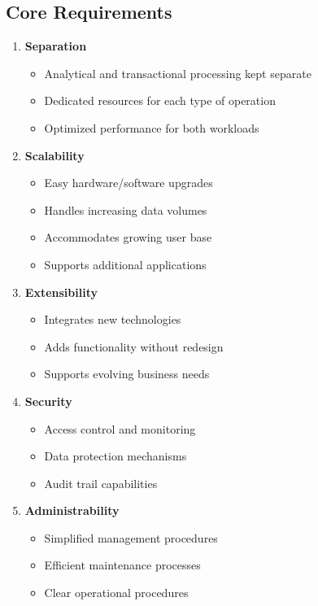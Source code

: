 \subsection{Core Requirements}
\begin{enumerate}
    \item \textbf{Separation}
        \begin{itemize}
            \item Analytical and transactional processing kept separate
            \item Dedicated resources for each type of operation
            \item Optimized performance for both workloads
        \end{itemize}
    \item \textbf{Scalability}
        \begin{itemize}
            \item Easy hardware/software upgrades
            \item Handles increasing data volumes
            \item Accommodates growing user base
            \item Supports additional applications
        \end{itemize}
    \item \textbf{Extensibility}
        \begin{itemize}
            \item Integrates new technologies
            \item Adds functionality without redesign
            \item Supports evolving business needs
        \end{itemize}
    \item \textbf{Security}
        \begin{itemize}
            \item Access control and monitoring
            \item Data protection mechanisms
            \item Audit trail capabilities
        \end{itemize}
    \item \textbf{Administrability}
        \begin{itemize}
            \item Simplified management procedures
            \item Efficient maintenance processes
            \item Clear operational procedures
        \end{itemize}
\end{enumerate}

